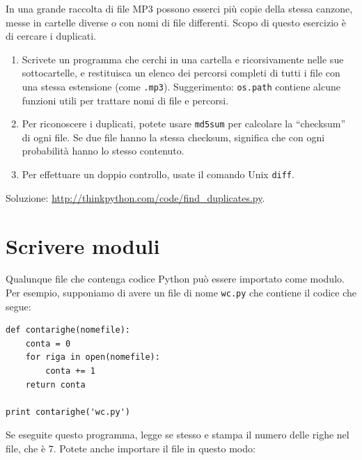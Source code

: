 \documentclass[10pt]{book}
\begin{document}
\vspace{0.2in}
\begin{exercise}
\label{checksum}

In una grande raccolta di file MP3 possono esserci più copie della stessa canzone, messe in cartelle diverse o con nomi di file differenti. Scopo di questo esercizio è di cercare i duplicati.

\begin{enumerate}

\item Scrivete un programma che cerchi in una cartella e ricorsivamente nelle sue sottocartelle, e restituisca un elenco dei percorsi completi di tutti i file con una stessa estensione (come {\tt .mp3}).
Suggerimento: {\tt os.path} contiene alcune funzioni utili per trattare nomi di file e percorsi.

\item Per riconoscere i duplicati, potete usare {\tt md5sum}
per calcolare la ``checksum'' di ogni file. Se due file hanno la stessa checksum, significa che con ogni probabilità hanno lo stesso contenuto.

\item Per effettuare un doppio controllo, usate il comando Unix {\tt diff}.

\end{enumerate}

Soluzione: \url{http://thinkpython.com/code/find_duplicates.py}.

\end{exercise}


\section{Scrivere moduli}
\label{modules}

Qualunque file che contenga codice Python può essere importato come modulo. Per esempio, supponiamo di avere un file di nome {\tt wc.py} che contiene il codice che segue:

\begin{verbatim}
def contarighe(nomefile):
    conta = 0
    for riga in open(nomefile):
        conta += 1
    return conta

print contarighe('wc.py')
\end{verbatim}
%
Se eseguite questo programma, legge se stesso e stampa il numero delle righe nel file, che è 7. Potete anche importare il file in questo modo:
\end{document}
